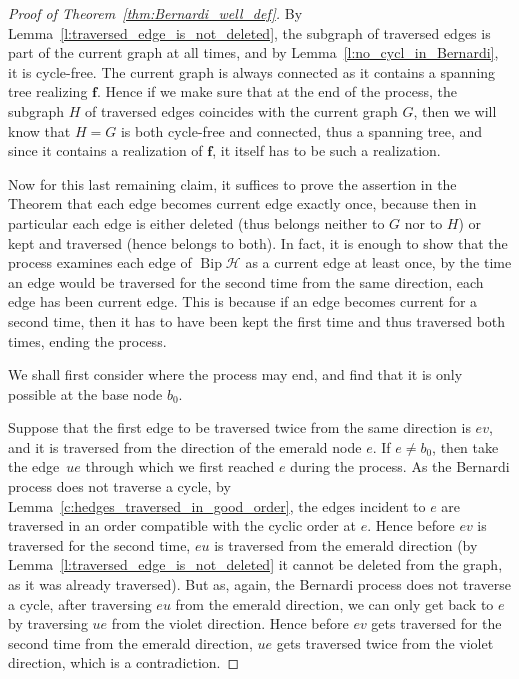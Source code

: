 \documentclass[10pt]{amsart}
\theoremstyle{definition}\newtheorem{defi}[theo]{Definition}
\theoremstyle{remark}\newtheorem{rema}[theo]{Remark}
\newcommand{\HH}{\mathcal H}
\DeclareMathOperator{\bip}{Bip}
\begin{document}
\begin{proof}[Proof of Theorem~\ref{thm:Bernardi_well_def}]
By Lemma~\ref{l:traversed_edge_is_not_deleted}, the subgraph of traversed edges is part of the current graph at all times, and by Lemma~\ref{l:no_cycl_in_Bernardi}, it is cycle-free. The current graph is always connected as it contains a spanning tree realizing $\mathbf f$. Hence if we make sure that at the end of the process, the subgraph $H$ of traversed edges coincides with the current graph $G$, then we will know that $H=G$ is both cycle-free and connected, thus a spanning tree, and since it contains a realization of $\mathbf f$, it itself has to be such a realization. 

Now for this last remaining claim, it suffices to prove the assertion in the Theorem that each edge becomes current edge exactly once, because then in particular each edge is either deleted (thus belongs neither to $G$ nor to $H$) or kept and traversed (hence belongs to both). In fact, it is enough to show that the process examines each edge of $\bip \HH$ as a current edge at least once, \ie by the time an edge would be traversed for the second time from the same direction, each edge has been current edge. This is because if an edge becomes current for a second time, then it has to have been kept the first time and thus traversed both times, ending the process.

We shall first consider where the process may end, and find that it is only possible at the base node $b_0$.

Suppose that the first edge to be traversed twice from the same direction is $ev$, and it is traversed from the direction of the emerald node $e$. If $e\neq b_0$, then take the edge~$ue$ through which we first reached $e$ during the process. As the Bernardi process does not traverse a cycle, by Lemma~\ref{c:hedges_traversed_in_good_order}, the edges incident to $e$ are traversed in an order compatible with the cyclic order at $e$. Hence before $ev$ is traversed for the second time, $eu$ is traversed from the emerald direction (by Lemma~\ref{l:traversed_edge_is_not_deleted} it cannot be deleted from the graph, as it was already traversed). But as, again, the Bernardi process does not traverse a cycle, after traversing $eu$ from the emerald direction, we can only get back to $e$ by traversing $ue$ from the violet direction. Hence before $ev$ gets traversed for the second time from the emerald direction, $ue$ gets traversed twice from the violet direction, which is a contradiction.


\end{proof}
\end{document}
